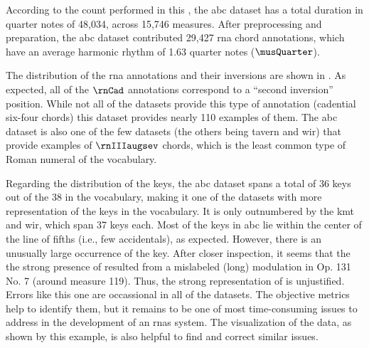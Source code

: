 
According to the count performed in this \thesisdiss{}, the
\gls{abc} dataset has a total duration in quarter notes of
48,034, across 15,746 measures. After preprocessing and
preparation, the \gls{abc} dataset contributed 29,427
\gls{rna} chord annotations, which have an average harmonic
rhythm of 1.63 quarter notes ($\musQuarter$).

The distribution of the \gls{rna} annotations and their
inversions are shown in . As
expected, all of the $\rnCad$ annotations correspond to a
``second inversion'' position. While not all of the datasets
provide this type of annotation (cadential six-four chords)
this dataset provides nearly 110 examples of them. The
\gls{abc} dataset is also one of the few datasets (the
others being \gls{tavern} and \gls{wir}) that provide
examples of $\rnIIIaugsev$ chords, which is the least common
type of Roman numeral of the vocabulary.


Regarding the distribution of the keys, the \gls{abc}
dataset spans a total of 36 keys out of the 38 in the
vocabulary, making it one of the datasets with more
representation of the keys in the vocabulary. It is only
outnumbered by the \gls{kmt} and \gls{wir}, which span 37
keys each. Most of the keys in \gls{abc} lie within the
center of the line of fifths (i.e., few accidentals), as
expected. However, there is an unusually large occurrence of
the \keyDs{} key. After closer inspection, it seems that the
the strong presence of \keyDs{} resulted from a mislabeled
(long) modulation in Op. 131 No. 7 (around measure 119).
Thus, the strong representation of \keyDs{} is unjustified.
Errors like this one are occassional in all of the datasets.
The objective metrics help to identify them, but it remains
to be one of most time-consuming issues to address in the
development of an \glspl{rna} system. The visualization of
the data, as shown by this example, is also helpful to find
and correct similar issues.


